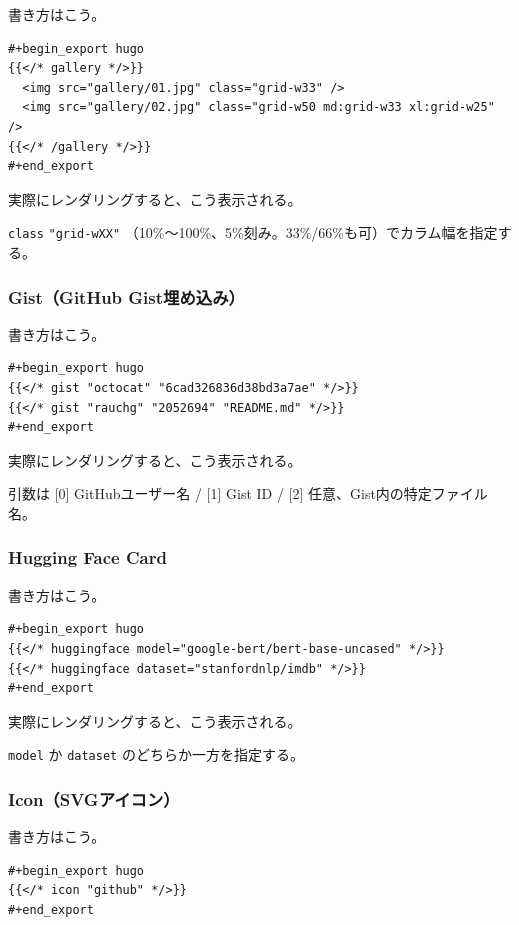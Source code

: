 \documentclass[11pt]{article}
\begin{document}
書き方はこう。

\begin{verbatim}
#+begin_export hugo
{{</* gallery */>}}
  <img src="gallery/01.jpg" class="grid-w33" />
  <img src="gallery/02.jpg" class="grid-w50 md:grid-w33 xl:grid-w25" />
{{</* /gallery */>}}
#+end_export
\end{verbatim}

実際にレンダリングすると、こう表示される。

\texttt{class} \texttt{"grid-wXX"} （10\%〜100\%、5\%刻み。33\%/66\%も可）でカラム幅を指定する。
\subsubsection{Gist（GitHub Gist埋め込み）}
\label{sec:org37da7c9}

書き方はこう。

\begin{verbatim}
#+begin_export hugo
{{</* gist "octocat" "6cad326836d38bd3a7ae" */>}}
{{</* gist "rauchg" "2052694" "README.md" */>}}
#+end_export
\end{verbatim}

実際にレンダリングすると、こう表示される。

引数は [0] GitHubユーザー名 / [1] Gist ID / [2] 任意、Gist内の特定ファイル名。
\subsubsection{Hugging Face Card}
\label{sec:org0b1b1d5}

書き方はこう。

\begin{verbatim}
#+begin_export hugo
{{</* huggingface model="google-bert/bert-base-uncased" */>}}
{{</* huggingface dataset="stanfordnlp/imdb" */>}}
#+end_export
\end{verbatim}

実際にレンダリングすると、こう表示される。

\texttt{model} か \texttt{dataset} のどちらか一方を指定する。
\subsubsection{Icon（SVGアイコン）}
\label{sec:orgc3035d9}

書き方はこう。

\begin{verbatim}
#+begin_export hugo
{{</* icon "github" */>}}
#+end_export
\end{verbatim}
\end{document}
